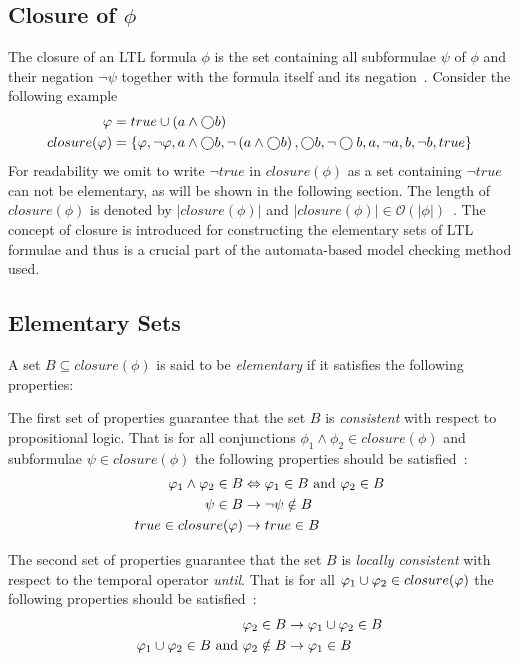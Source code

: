 \subsection{Closure of $\phi$}
The closure of an LTL formula $\phi$ is the set containing all subformulae $\psi$ of $\phi$ and their negation $\lnot \psi$ together with the formula itself and its negation~\cite[Def.~5.34]{baier2008principles}. Consider the following example
\begin{align*}
    \varphi &= true \cup \left( a \land \bigcirc b \right) \\
    closure(\varphi) &= \left\{ \varphi, \lnot \varphi, a \land \bigcirc b, \lnot \left( a \land \bigcirc b \right), \bigcirc b, \lnot \bigcirc b, a, \lnot a, b, \lnot b, true \right\}
\end{align*}
For readability we omit to write $\lnot true$ in $closure(\phi)$ as a set containing $\lnot true$ can not be elementary, as will be shown in the following section. The length of $closure(\phi)$ is denoted by $|closure(\phi)|$ and $|closure(\phi)| \in \mathcal{O}\left(|\phi|\right)$~\cite{baier2008principles}. The concept of closure is introduced for constructing the elementary sets of LTL formulae and thus is a crucial part of the automata-based model checking method used.

\subsection{Elementary Sets}\label{sec:elemesets}
A set $B \subseteq closure(\phi)$ is said to be \emph{elementary} if it satisfies the following properties:

The first set of properties guarantee that the set $B$ is \emph{consistent} with respect to propositional logic. That is for all conjunctions $\phi_1 \land \phi_2 \in closure(\phi)$ and subformulae $\psi \in closure(\phi)$ the following properties should be satisfied~\cite[Fig.~5.20]{baier2008principles}:
\begin{align}
    \varphi_1 \land \varphi_2 \in B &\Leftrightarrow \varphi_1 \in B \text{ and } \varphi_2 \in B \label{eq:elem1.1} \\
    \psi \in B &\rightarrow \lnot \psi \notin B \label{eq:elem1.2} \\
    true \in closure(\varphi) &\rightarrow true \in B \label{eq:elem1.3}
\end{align}

The second set of properties guarantee that the set $B$ is \emph{locally consistent} with respect to the temporal operator \emph{until}. That is for all $\varphi_1 \cup \varphi_2 \in closure(\varphi)$ the following properties should be satisfied~\cite[Fig.~5.20]{baier2008principles}:
\begin{align}
    \varphi_2 \in B &\rightarrow \varphi_1 \cup \varphi_2 \in B \label{eq:elem2.1} \\
    \varphi_1 \cup \varphi_2 \in B \text{ and } \varphi_2 \notin B &\rightarrow \varphi_1 \in B \label{eq:elem2.2}
\end{align}

